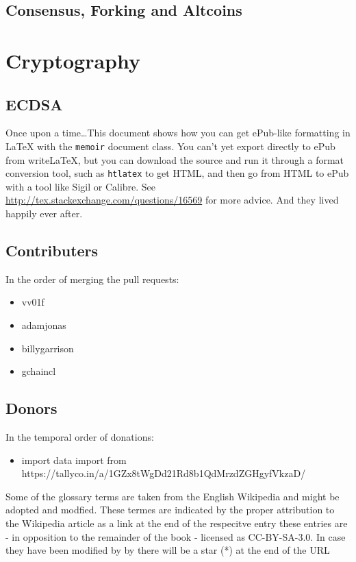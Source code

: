 \documentclass[ebook,12pt,oneside,openany]{memoir}
\begin{document}
\section{Consensus, Forking and Altcoins}


\appendix
\chapter{Cryptography}
\section{ECDSA}

Once upon a time\ldots This document shows how you can get ePub-like formatting in \LaTeX{} with the \verb|memoir| document class. You can't yet export directly to ePub from writeLaTeX, but you can download the source and run it through a format conversion tool, such as \verb|htlatex| to get HTML, and then go from HTML to ePub with a tool like Sigil or Calibre. See \url{http://tex.stackexchange.com/questions/16569} for more advice. And they lived happily ever after.

\appendix
\section{Contributers}
In the order of merging the pull requests:
\begin{itemize}
\item vv01f
\item adamjonas
\item billygarrison
\item gchaincl
\end{itemize}

\section{Donors}
In the temporal order of donations:
\begin{itemize}
\item import data import from https://tallyco.in/a/1GZx8tWgDd21Rd8b1QdMrzdZGHgyfVkzaD/


\end{itemize}

\glsaddall

Some of the glossary terms are taken from the English Wikipedia and might be adopted and modfied. These termes are indicated by the proper attribution to the Wikipedia article as a link at the end of the respecitve entry these entries are - in opposition to the remainder of the book - licensed as CC-BY-SA-3.0. In case they have been modified by by there will be a star (*) at the end of the URL

\printnoidxglossaries
\end{document}
